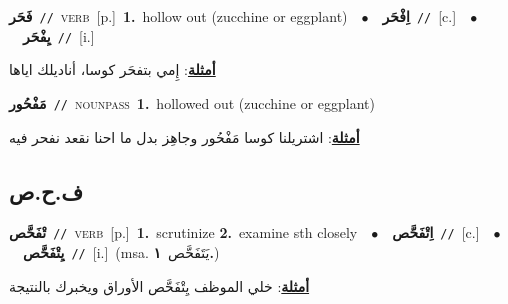\documentclass[10pt,a4paper,twoside]{article} %
\begin{document}
\begin{multicols}{2}
{\setlength\topsep{0pt}\textbf{\foreignlanguage{arabic}{فَحَر}}\ {\color{gray}\texttt{//}\color{black}}\ \textsc{verb}\ [p.]\ \textbf{1.}~hollow out (zucchine or eggplant)\ \ $\bullet$\ \ \setlength\topsep{0pt}\textbf{\foreignlanguage{arabic}{اِفْحَر}}\ {\color{gray}\texttt{//}\color{black}}\ [c.]\ \ $\bullet$\ \ \setlength\topsep{0pt}\textbf{\foreignlanguage{arabic}{يِفْحَر}}\ {\color{gray}\texttt{//}\color{black}}\ [i.]\  \begin{flushright}\color{gray}\foreignlanguage{arabic}{\textbf{\underline{\foreignlanguage{arabic}{أمثلة}}}: إِمي بتفحَر كوسا، أناديلك اياها}\end{flushright}\color{black}} \vspace{2mm}

{\setlength\topsep{0pt}\textbf{\foreignlanguage{arabic}{مَفْحُور}}\ {\color{gray}\texttt{//}\color{black}}\ \textsc{noun\textunderscore pass}\ \textbf{1.}~hollowed out (zucchine or eggplant)\  \begin{flushright}\color{gray}\foreignlanguage{arabic}{\textbf{\underline{\foreignlanguage{arabic}{أمثلة}}}: اشتريلنا كوسا مَفْحُور وجاهِز بدل ما احنا نقعد نفحر فيه}\end{flushright}\color{black}} \vspace{2mm}

\vspace{-3mm}
\subsection*{\color{blue}\foreignlanguage{arabic}{ف.ح.ص}\color{blue}{}} 

{\setlength\topsep{0pt}\textbf{\foreignlanguage{arabic}{تْفَحَّص}}\ {\color{gray}\texttt{//}\color{black}}\ \textsc{verb}\ [p.]\ \textbf{1.}~scrutinize  \textbf{2.}~examine sth closely\ \ $\bullet$\ \ \setlength\topsep{0pt}\textbf{\foreignlanguage{arabic}{اِتْفَحَّص}}\ {\color{gray}\texttt{//}\color{black}}\ [c.]\ \ $\bullet$\ \ \setlength\topsep{0pt}\textbf{\foreignlanguage{arabic}{يِتْفَحَّص}}\ {\color{gray}\texttt{//}\color{black}}\ [i.]\ \color{gray}(msa. \foreignlanguage{arabic}{يَتَفَحَّص}~\foreignlanguage{arabic}{\textbf{١.}})\color{black}\  \begin{flushright}\color{gray}\foreignlanguage{arabic}{\textbf{\underline{\foreignlanguage{arabic}{أمثلة}}}: خلي الموظف يِتْفَحَّص الأوراق ويخبرك بالنتيجة}\end{flushright}\color{black}} \vspace{2mm}


\end{multicols}
\end{document}
